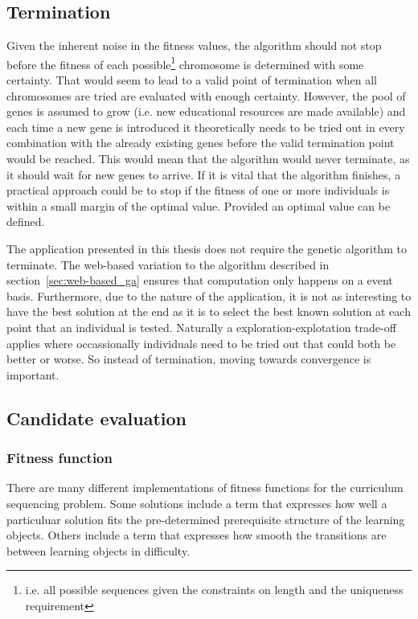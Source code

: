 \subsection{Termination}
\label{sec:approach_termination}
Given the inherent noise in the fitness values, the algorithm should not stop
before the fitness of each possible\footnote{i.e. all possible sequences given
the constraints on length and the uniqueness requirement} chromosome is determined
with some certainty. That would seem to lead to a valid point of termination
when all chromosomes are tried are evaluated with enough certainty. However,
the pool of genes is assumed to grow (i.e. new educational resources are made
available) and each time a new gene is introduced it theoretically needs to be
tried out in every combination with the already existing genes before the valid
termination point would be reached. This would mean that the algorithm would
never terminate, as it should wait for new genes to arrive. If it is vital that
the algorithm finishes, a practical approach could be to stop if the fitness of
one or more individuals is within a small margin of the optimal value. Provided
an optimal value can be defined.

The application presented in this thesis does not require the genetic algorithm
to terminate. The web-based variation to the algorithm described in
section~\ref{sec:web-based_ga} ensures that computation only happens on a event
basis. Furthermore, due to the nature of the application, it is not
as interesting to have the best solution at the end as it is to select the best
known solution at each point that an individual is tested. Naturally a
exploration-explotation trade-off applies where occassionally individuals need
to be tried out that could both be better or worse. So instead of termination,
moving towards convergence is important.

\subsection{Candidate evaluation}
\subsubsection{Fitness function}
There are many different implementations of fitness functions for the
curriculum sequencing problem. Some solutions include a term that expresses how
well a particuluar solution fits the pre-determined prerequisite structure of
the learning objects. Others include a term that expresses how smooth the
transitions are between learning objects in difficulty.

